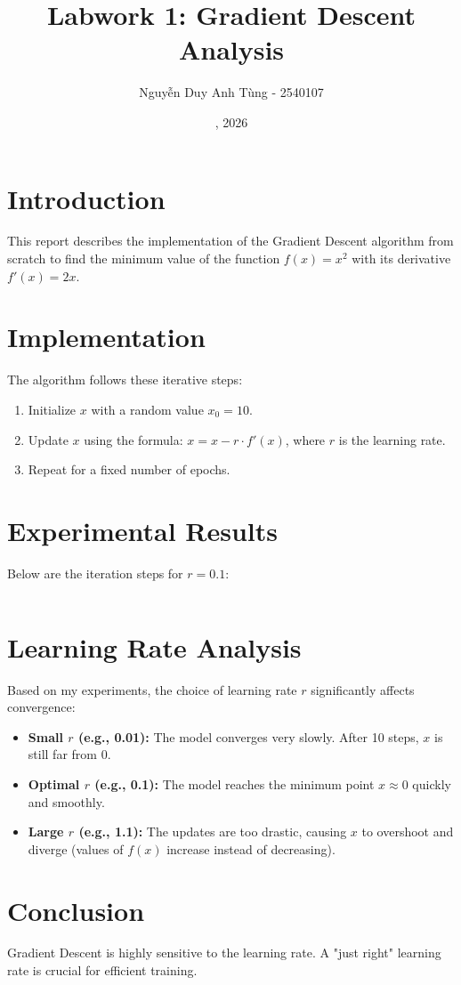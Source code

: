 \documentclass{article}
\title{Labwork 1: Gradient Descent Analysis}
\author{Nguyễn Duy Anh Tùng - 2540107}
\date{\May 6, 2026}
\begin{document}
\maketitle

\section{Introduction}
This report describes the implementation of the Gradient Descent algorithm from scratch to find the minimum value of the function $f(x) = x^2$ with its derivative $f'(x) = 2x$.

\section{Implementation}
The algorithm follows these iterative steps:
\begin{enumerate}
    \item Initialize $x$ with a random value $x_0 = 10$.
    \item Update $x$ using the formula: $x = x - r \cdot f'(x)$, where $r$ is the learning rate.
    \item Repeat for a fixed number of epochs.
\end{enumerate}

\section{Experimental Results}
Below are the iteration steps for $r = 0.1$:

\begin{center}
    \begin{tabular}{|l|} 
        \hline 
        \begin{minipage}{0.5\textwidth} 
            \vspace{2mm}
            
            \vspace{1mm}
        \end{minipage} \\
        \hline 
    \end{tabular}
\end{center}

\section{Learning Rate Analysis}
Based on my experiments, the choice of learning rate $r$ significantly affects convergence:

\begin{itemize}
    \item \textbf{Small $r$ (e.g., 0.01):} The model converges very slowly. After 10 steps, $x$ is still far from 0.
    \item \textbf{Optimal $r$ (e.g., 0.1):} The model reaches the minimum point $x \approx 0$ quickly and smoothly.
    \item \textbf{Large $r$ (e.g., 1.1):} The updates are too drastic, causing $x$ to overshoot and diverge (values of $f(x)$ increase instead of decreasing).
\end{itemize}

\section{Conclusion}
Gradient Descent is highly sensitive to the learning rate. A "just right" learning rate is crucial for efficient training.
\end{document}
